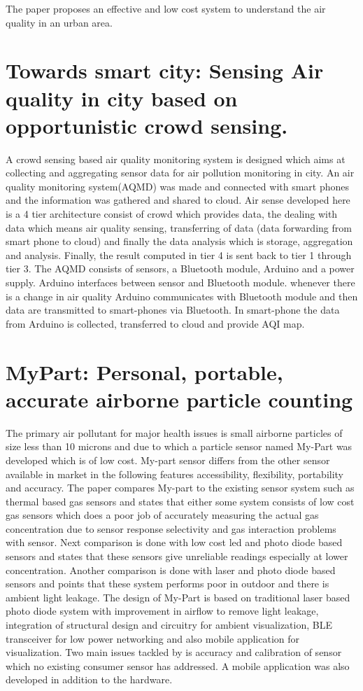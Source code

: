 \documentclass[10pt,a4paper]{report}
\begin{document}
The paper proposes an effective and low cost system to understand the air quality in an urban area.

\section{Towards smart city: Sensing Air quality in city based on opportunistic crowd sensing.}

A crowd sensing based air quality monitoring system is designed which aims at collecting and aggregating sensor data for air pollution monitoring in city. An air quality monitoring system(AQMD) was made and connected with smart phones and the information was gathered and shared to cloud. Air sense developed here is a 4 tier architecture consist of crowd which provides data, the dealing with data which means air quality sensing, transferring of data (data forwarding from smart phone to cloud) and finally the data analysis which is storage, aggregation and analysis. Finally, the result computed in tier 4 is sent back to tier 1 through tier 3. The AQMD consists of sensors, a Bluetooth module, Arduino and a power supply. Arduino interfaces between sensor and Bluetooth module. whenever there is a change in air quality Arduino communicates with Bluetooth module and then data are transmitted to smart-phones via Bluetooth. In smart-phone the data from Arduino is collected, transferred to cloud and provide AQI map.

\section{MyPart: Personal, portable, accurate airborne particle counting}

The primary air pollutant for major health issues is small airborne particles of size less than 10 microns and due to which a particle sensor named My-Part was developed which is of low cost. My-part sensor differs from the other sensor available in market in the following features accessibility, flexibility, portability and accuracy.
	 The paper compares My-part to the existing sensor system such as thermal based gas sensors and states that either some system consists of low cost gas sensors which does a poor job of accurately measuring the actual gas concentration due to sensor response selectivity and gas interaction problems with sensor. 
	 Next comparison is done with low cost led and photo diode based sensors and states that these sensors give unreliable readings especially at lower concentration. Another comparison is done with laser and photo diode based sensors and points that these system performs poor in outdoor and there is ambient light leakage. The design of My-Part is based on traditional laser based photo diode system with improvement in airflow to remove light leakage, integration of structural design and circuitry for ambient visualization, BLE transceiver for low power networking and also mobile application for visualization. Two main issues tackled by  is accuracy and calibration of sensor which no existing consumer sensor has addressed. A mobile application was also developed in addition to the hardware.
\end{document}
